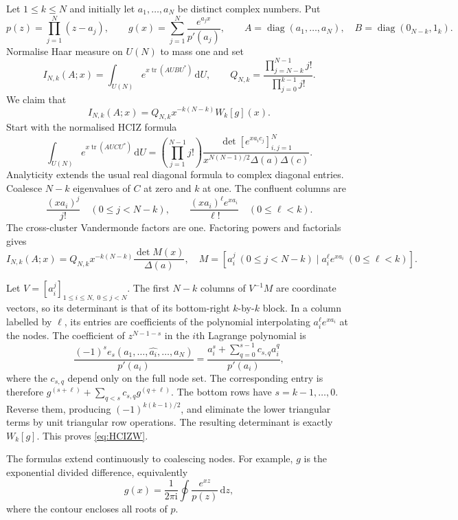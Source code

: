 \documentclass[11pt]{article}
\numberwithin{equation}{section}
\theoremstyle{remark}
\newcommand{\ii}{\mathrm{i}}
\newcommand{\dd}{\,\mathrm{d}}
\DeclareMathOperator{\tr}{tr}
\DeclareMathOperator{\diag}{diag}
\begin{document}
Let $1\le k\le N$ and initially let $a_1,\ldots,a_N$ be distinct
complex numbers. Put
\[
 p(z)=\prod_{j=1}^N(z-a_j),\qquad
 g(x)=\sum_{j=1}^N\frac{e^{a_jx}}{p'(a_j)},\qquad
 A=\diag(a_1,\ldots,a_N),\quad B=\diag(0_{N-k},1_k).
\]
Normalise Haar measure on $U(N)$ to mass one and set
\[
 I_{N,k}(A;x)=\int_{U(N)}e^{x\tr(AUBU^*)}\dd U,\qquad
 Q_{N,k}=\frac{\prod_{j=N-k}^{N-1}j!}{\prod_{j=0}^{k-1}j!}.
\]
We claim that
\begin{equation}\label{eq:HCIZW}
            I_{N,k}(A;x)=Q_{N,k}x^{-k(N-k)}W_k[g](x).
\end{equation}
Start with the normalised HCIZ formula
\begin{equation}\label{eq:HCIZ}
 \int_{U(N)}e^{x\tr(AUCU^*)}\dd U
 =\left(\prod_{j=1}^{N-1}j!\right)
 \frac{\det[e^{xa_ic_j}]_{i,j=1}^N}
 {x^{N(N-1)/2}\Delta(a)\Delta(c)}.
\end{equation}
Analyticity extends the usual real diagonal formula to complex
diagonal entries. Coalesce $N-k$ eigenvalues of $C$ at zero and $k$
at one. The confluent columns are
\[
 \frac{(xa_i)^j}{j!}\quad(0\le j<N-k),\qquad
 \frac{(xa_i)^\ell e^{xa_i}}{\ell!}\quad(0\le\ell<k).
\]
The cross-cluster Vandermonde factors are one. Factoring powers and
factorials gives
\begin{equation}\label{eq:Mdet}
 I_{N,k}(A;x)=Q_{N,k}x^{-k(N-k)}\frac{\det M(x)}{\Delta(a)},
 \quad
 M=[a_i^j\ (0\le j<N-k)\mid a_i^\ell e^{xa_i}\ (0\le\ell<k)].
\end{equation}

Let $V=[a_i^j]_{1\le i\le N,\;0\le j<N}$. The first $N-k$ columns
of $V^{-1}M$ are coordinate vectors, so its determinant is that of its
bottom-right $k$-by-$k$ block. In a column labelled by $\ell$, its
entries are coefficients of the polynomial interpolating
$a_i^\ell e^{xa_i}$ at the nodes. The coefficient of $z^{N-1-s}$ in
the $i$th Lagrange polynomial is
\[
 \frac{(-1)^se_s(a_1,\ldots,\widehat{a_i},\ldots,a_N)}{p'(a_i)}
 =\frac{a_i^s+\sum_{q=0}^{s-1}c_{s,q}a_i^q}{p'(a_i)},
\]
where the $c_{s,q}$ depend only on the full node set. The corresponding
entry is therefore
$g^{(s+\ell)}+\sum_{q<s}c_{s,q}g^{(q+\ell)}$.
The bottom rows have $s=k-1,\ldots,0$. Reverse them, producing
$(-1)^{k(k-1)/2}$, and eliminate the lower triangular terms by unit
triangular row operations. The resulting determinant is exactly
$W_k[g]$. This proves \eqref{eq:HCIZW}.

The formulas extend continuously to coalescing nodes. For example,
$g$ is the exponential divided difference, equivalently
\[
                         g(x)=\frac1{2\pi\ii}\oint\frac{e^{xz}}{p(z)}\dd z,
\]
where the contour encloses all roots of $p$.
\end{document}
